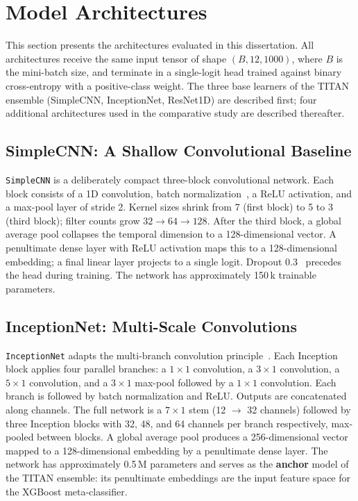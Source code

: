 \section{Model Architectures}
\label{sec:archs}

This section presents the architectures evaluated in this dissertation. All architectures receive the same input tensor of shape $(B, 12, 1000)$, where $B$ is the mini-batch size, and terminate in a single-logit head trained against binary cross-entropy with a positive-class weight. The three base learners of the TITAN ensemble (SimpleCNN, InceptionNet, ResNet1D) are described first; four additional architectures used in the comparative study are described thereafter.

\subsection{SimpleCNN: A Shallow Convolutional Baseline}
\label{sec:simplecnn}

\texttt{SimpleCNN} is a deliberately compact three-block convolutional network. Each block consists of a 1D convolution, batch normalization~\cite{ioffe2015batch}, a ReLU activation, and a max-pool layer of stride 2. Kernel sizes shrink from 7 (first block) to 5 to 3 (third block); filter counts grow $32 \to 64 \to 128$. After the third block, a global average pool collapses the temporal dimension to a 128-dimensional vector. A penultimate dense layer with ReLU activation maps this to a 128-dimensional embedding; a final linear layer projects to a single logit. Dropout $0.3$~\cite{srivastava2014dropout} precedes the head during training. The network has approximately 150\,k trainable parameters.

\subsection{InceptionNet: Multi-Scale Convolutions}
\label{sec:inception}

\texttt{InceptionNet} adapts the multi-branch convolution principle~\cite{szegedy2015going,ismail2020inception}. Each Inception block applies four parallel branches: a $1\times 1$ convolution, a $3\times 1$ convolution, a $5\times 1$ convolution, and a $3\times 1$ max-pool followed by a $1\times 1$ convolution. Each branch is followed by batch normalization and ReLU. Outputs are concatenated along channels. The full network is a $7\times 1$ stem (12 $\to$ 32 channels) followed by three Inception blocks with 32, 48, and 64 channels per branch respectively, max-pooled between blocks. A global average pool produces a 256-dimensional vector mapped to a 128-dimensional embedding by a penultimate dense layer. The network has approximately 0.5\,M parameters and serves as the \textbf{anchor} model of the TITAN ensemble: its penultimate embeddings are the input feature space for the XGBoost meta-classifier.

